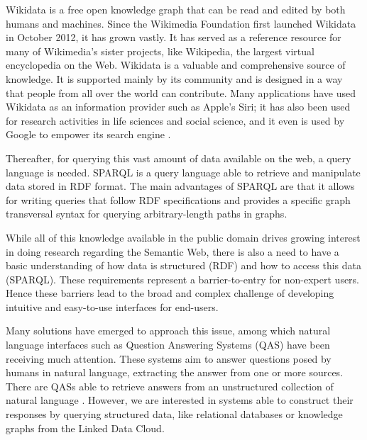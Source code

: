 Wikidata \cite{KG:wikidata} is a free open knowledge graph that can be read and edited by both humans 
and machines. Since the Wikimedia Foundation first launched Wikidata in October 2012, 
it has grown vastly. It has served as a reference resource for many of Wikimedia’s sister 
projects, like Wikipedia, the largest virtual encyclopedia on the Web. Wikidata is a valuable 
and comprehensive source of knowledge. It is supported mainly by its community and is 
designed in a way that people from all over the world can contribute. Many applications have 
used Wikidata as an information provider such as Apple’s Siri; it has also been used for research activities in life 
sciences and social science, and it even is used by Google to empower its search engine \cite{wikidata:usage-MalyshevKGGB18}.

Thereafter, for querying this vast amount of data available on the web, a query language is 
needed. SPARQL \cite{key:sparql11} is a query language able to retrieve and manipulate data stored in RDF 
format. The main advantages of SPARQL are that it allows for writing queries that follow RDF 
specifications and provides a specific graph transversal syntax for querying arbitrary-length 
paths in graphs.

While all of this knowledge available in the public domain drives growing interest in doing 
research regarding the Semantic Web, there is also a need to have a basic understanding of 
how data is structured (RDF) and how to access this data (SPARQL). These requirements 
represent a barrier-to-entry for non-expert users. Hence these barriers lead to the broad and 
complex challenge of developing intuitive and easy-to-use interfaces for end-users.

Many solutions have emerged to approach this issue, among which natural language interfaces 
such as Question Answering Systems (QAS) \cite{qa:survey-BOUZIANE2015366, qa:intro-UngerFC14, qa:nn-qakg-Chakraborty19} 
have been receiving much attention. 
These systems aim to answer questions posed by humans in natural language, extracting the 
answer from one or more sources. There are QASs able to retrieve answers from an unstructured 
collection of natural language \cite{qa:survey-BOUZIANE2015366}. However, we are interested in systems able to 
construct their responses by querying structured data, like relational databases or knowledge 
graphs from the Linked Data Cloud.

